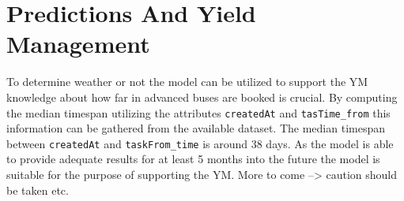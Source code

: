 \section{Predictions And Yield Management}
\label{sec:pred_and_ym}
To determine weather or not the model can be utilized to support the YM knowledge about how far in advanced buses are booked is crucial. By computing the median timespan utilizing the attributes \verb|createdAt| and \verb|tasTime_from| this information can be gathered from the available dataset. The median timespan between \verb|createdAt| and \verb|taskFrom_time| is around 38 days. As the model is able to provide adequate results for at least 5 months into the future the model is suitable for the purpose of supporting the YM.  More to come --> caution should be taken etc.